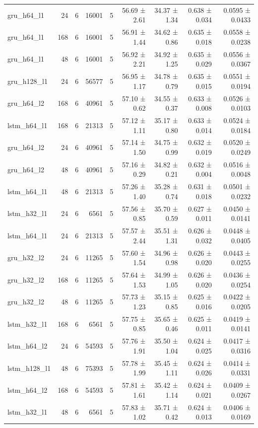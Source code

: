 \begin{table}[htbp]
\begin{tabular}{lrrrrrrrr}
gru\_h64\_l1 & 24 & 6 & 16001 & 5 & 56.69 ± 2.61 & 34.37 ± 1.34 & 0.638 ± 0.034 & 0.0595 ± 0.0433 \\
gru\_h64\_l1 & 168 & 6 & 16001 & 5 & 56.91 ± 1.44 & 34.62 ± 0.86 & 0.635 ± 0.018 & 0.0558 ± 0.0238 \\
gru\_h64\_l1 & 48 & 6 & 16001 & 5 & 56.92 ± 2.21 & 34.92 ± 1.25 & 0.635 ± 0.029 & 0.0556 ± 0.0367 \\
gru\_h128\_l1 & 24 & 6 & 56577 & 5 & 56.95 ± 1.17 & 34.78 ± 0.79 & 0.635 ± 0.015 & 0.0551 ± 0.0194 \\
gru\_h64\_l2 & 168 & 6 & 40961 & 5 & 57.10 ± 0.62 & 34.55 ± 0.37 & 0.633 ± 0.008 & 0.0526 ± 0.0103 \\
lstm\_h64\_l1 & 168 & 6 & 21313 & 5 & 57.12 ± 1.11 & 35.17 ± 0.80 & 0.633 ± 0.014 & 0.0524 ± 0.0184 \\
gru\_h64\_l2 & 24 & 6 & 40961 & 5 & 57.14 ± 1.50 & 34.75 ± 0.99 & 0.632 ± 0.019 & 0.0520 ± 0.0249 \\
gru\_h64\_l2 & 48 & 6 & 40961 & 5 & 57.16 ± 0.29 & 34.82 ± 0.21 & 0.632 ± 0.004 & 0.0516 ± 0.0048 \\
lstm\_h64\_l1 & 48 & 6 & 21313 & 5 & 57.26 ± 1.40 & 35.28 ± 0.74 & 0.631 ± 0.018 & 0.0501 ± 0.0232 \\
lstm\_h32\_l1 & 24 & 6 & 6561 & 5 & 57.56 ± 0.85 & 35.70 ± 0.59 & 0.627 ± 0.011 & 0.0450 ± 0.0141 \\
lstm\_h64\_l1 & 24 & 6 & 21313 & 5 & 57.57 ± 2.44 & 35.51 ± 1.31 & 0.626 ± 0.032 & 0.0448 ± 0.0405 \\
gru\_h32\_l2 & 24 & 6 & 11265 & 5 & 57.60 ± 1.54 & 34.96 ± 0.98 & 0.626 ± 0.020 & 0.0443 ± 0.0255 \\
gru\_h32\_l2 & 168 & 6 & 11265 & 5 & 57.64 ± 1.53 & 34.99 ± 1.05 & 0.626 ± 0.020 & 0.0436 ± 0.0254 \\
gru\_h32\_l2 & 48 & 6 & 11265 & 5 & 57.73 ± 1.23 & 35.15 ± 0.85 & 0.625 ± 0.016 & 0.0422 ± 0.0205 \\
lstm\_h32\_l1 & 168 & 6 & 6561 & 5 & 57.75 ± 0.85 & 35.65 ± 0.46 & 0.625 ± 0.011 & 0.0419 ± 0.0141 \\
lstm\_h64\_l2 & 24 & 6 & 54593 & 5 & 57.76 ± 1.91 & 35.50 ± 1.04 & 0.624 ± 0.025 & 0.0417 ± 0.0316 \\
lstm\_h128\_l1 & 48 & 6 & 75393 & 5 & 57.78 ± 1.99 & 35.45 ± 1.11 & 0.624 ± 0.026 & 0.0414 ± 0.0331 \\
lstm\_h64\_l2 & 168 & 6 & 54593 & 5 & 57.81 ± 1.61 & 35.42 ± 1.14 & 0.624 ± 0.021 & 0.0409 ± 0.0267 \\
lstm\_h32\_l1 & 48 & 6 & 6561 & 5 & 57.83 ± 1.02 & 35.71 ± 0.42 & 0.624 ± 0.013 & 0.0406 ± 0.0169 \\

\end{tabular}
\end{table}
